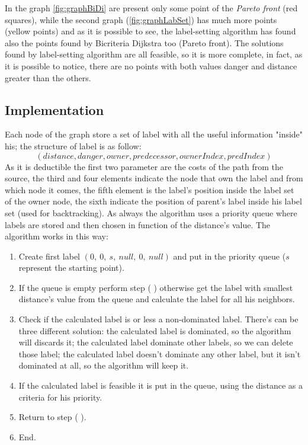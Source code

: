 \documentclass[a4paper,11pt]{report}
\newcommand{\RN}[1]{%
	\textup{\lowercase\expandafter{\romannumeral#1}}%
}
\begin{document}
In the graph \ref{fig:graphBiDi} are present only some point of the \textit{Pareto front} (red squares), while the second graph (\ref{fig:graphLabSet}) has much more points (yellow points) and as it is possible to see, the label-setting algorithm has found also the points found by Bicriteria Dijkstra too (Pareto front). The solutions found by label-setting algorithm are all feasible, so it is more complete, in fact, as it is possible to notice, there are no points with both values danger and distance greater than the others.


\subsection{Implementation}
Each node of the graph store a set of label with all the useful information "inside" his; the structure of label is as follow:
$$(distance, danger, owner, predecessor, ownerIndex, predIndex)$$
As it is deductible the first two parameter are the costs of the path from the source, the third and four elements indicate the node that own the label and from which node it comes, the fifth element is the label's position inside the label set of the owner node, the sixth indicate the position of parent's label inside his label set (used for backtracking).
As always the algorithm uses a priority queue where labels are stored and then chosen in function of the distance's value. The algorithm works in this way:

\begin{enumerate}[label=\roman*.]
	\item Create first label $(0,\ 0,\ s,\ null,\ 0,\ null)$ and put in the priority queue ($s$ represent the starting point).
	\item If the queue is empty perform step (\RN{6}) otherwise get the label with smallest distance's value from the queue and calculate the label for all his neighbors.
	\item Check if the calculated label is or less a non-dominated label. There's can be three different solution: the calculated label is dominated, so the algorithm will discards it; the calculated label dominate other labels, so we can delete those label; the calculated label doesn't dominate any other label, but it isn't dominated at all, so the algorithm will keep it.
	\item If the calculated label is feasible it is put in the queue, using the distance as a criteria for his priority.
	\item Return to step (\RN{2}).
	\item End.
\end{enumerate}
\end{document}
